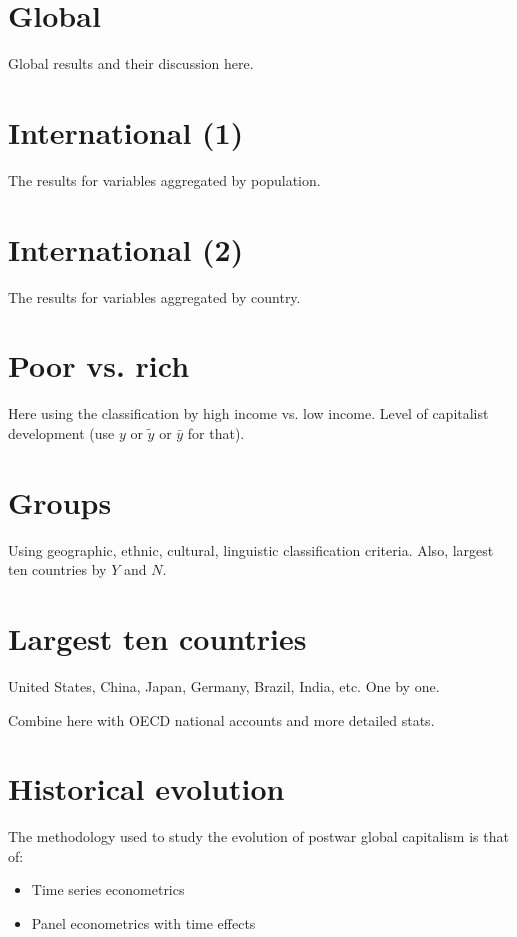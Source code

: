 \documentclass[pt=12]{article}
\begin{document}
\section{Global}

Global results and their discussion here.

\section{International (1)}

The results for variables aggregated by population.

\section{International (2)}

The results for variables aggregated by country.

\section{Poor vs. rich}

Here using the classification by high income vs. low income.  Level of capitalist development (use $y$ or $\tilde{y}$ or $\bar{y}$ for that).

\section{Groups}

Using geographic, ethnic, cultural, linguistic classification criteria.  Also, largest ten countries by $Y$ and $N$.

\section{Largest ten countries}

United States, China, Japan, Germany, Brazil, India, etc.  One by one.

Combine here with OECD national accounts and more detailed stats.


\section{Historical evolution}

The methodology used to study the evolution of postwar global capitalism is that of:

\begin{itemize}
\item Time series econometrics
\item Panel econometrics with time effects
\end{itemize}
\end{document}
